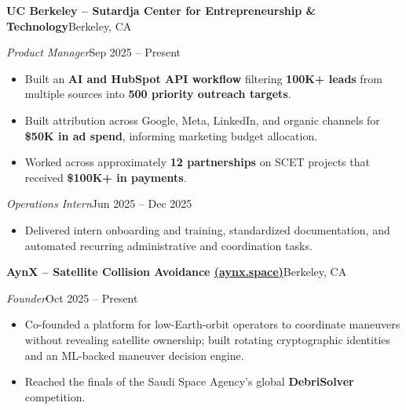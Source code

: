 \documentclass[a4paper,10pt]{article}
\newcommand{\entry}[4]{%
  \textbf{#1}\hfill #2\par
  \textit{#3}\hfill #4\par
}
\begin{document}
\entry{UC Berkeley -- Sutardja Center for Entrepreneurship \& Technology}{Berkeley, CA}
{Product Manager}{Sep 2025 -- Present}
\begin{itemize}
  \item Built an \textbf{AI and HubSpot API workflow} filtering \textbf{100K+ leads} from multiple sources into \textbf{500 priority outreach targets}.
  \item Built attribution across Google, Meta, LinkedIn, and organic channels for \textbf{\$50K in ad spend}, informing marketing budget allocation.
  \item Worked across approximately \textbf{12 partnerships} on SCET projects that received \textbf{\$100K+ in payments}.
\end{itemize}
\textit{Operations Intern}\hfill Jun 2025 -- Dec 2025\par
\begin{itemize}
  \item Delivered intern onboarding and training, standardized documentation, and automated recurring administrative and coordination tasks.
\end{itemize}

\entry{AynX -- Satellite Collision Avoidance \;\href{https://aynx.space}{(aynx.space)}}{Berkeley, CA}
{Founder}{Oct 2025 -- Present}
\begin{itemize}
  \item Co-founded a platform for low-Earth-orbit operators to coordinate maneuvers without revealing satellite ownership; built rotating cryptographic identities and an ML-backed maneuver decision engine.
  \item Reached the finals of the Saudi Space Agency's global \textbf{DebriSolver} competition.
\end{itemize}
\end{document}
